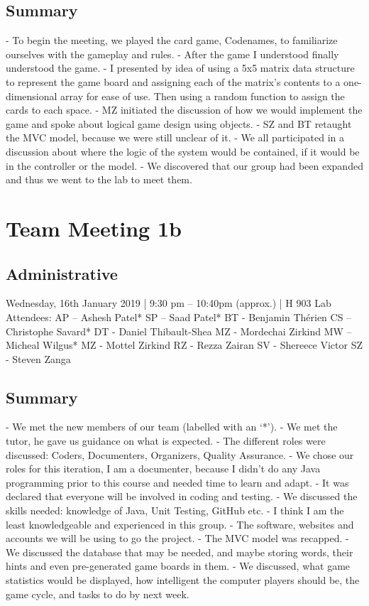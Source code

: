 \documentclass[12pt]{article}
\begin{document}
\subsection{Summary}
-	To begin the meeting, we played the card game, Codenames, to familiarize ourselves with the gameplay and rules. 
-	After the game I understood finally understood the game. 
-	I presented by idea of using a 5x5 matrix data structure to represent the game board and assigning each of the matrix’s contents to a one-dimensional array for ease of use. Then using a random function to assign the cards to each space. 
-	MZ initiated the discussion of how we would implement the game and spoke about logical game design using objects.
-	SZ and BT retaught the MVC model, because we were still unclear of it. 
-	We all participated in a discussion about where the logic of the system would be contained, if it would be in the controller or the model. 
-	We discovered that our group had been expanded and thus we went to the lab to meet them. 



\pagebreak
\section{Team Meeting 1b }

\subsection{Administrative}
Wednesday, 16th January 2019 | 9:30 pm – 10:40pm (approx.) | H 903 Lab 
Attendees: AP – Ashesh Patel*
SP – Saad Patel*
BT - Benjamin Thérien
CS – Christophe Savard* 
DT - Daniel Thibault-Shea
MZ - Mordechai Zirkind 
MW – Micheal Wilgus* 
MZ - Mottel Zirkind
RZ - Rezza Zairan 
SV - Shereece Victor 
SZ - Steven Zanga



\subsection{Summary}
-	We met the new members of our team (labelled with an ‘*’).
-	We met the tutor, he gave us guidance on what is expected.
-	The different roles were discussed: Coders, Documenters, Organizers, Quality Assurance.
-	We chose our roles for this iteration, I am a documenter, because I didn’t do any Java programming prior to this course and needed time to learn and adapt. 
-	It was declared that everyone will be involved in coding and testing. 
-	We discussed the skills needed: knowledge of Java, Unit Testing, GitHub etc.
-	I think I am the least knowledgeable and experienced in this group. 
-	The software, websites and accounts we will be using to go the project. 
-	The MVC model was recapped. 
-	We discussed the database that may be needed, and maybe storing words, their hints and even pre-generated game boards in them. 
-	We discussed, what game statistics would be displayed, how intelligent the computer players should be, the game cycle, and tasks to do by next week. 
\end{document}
